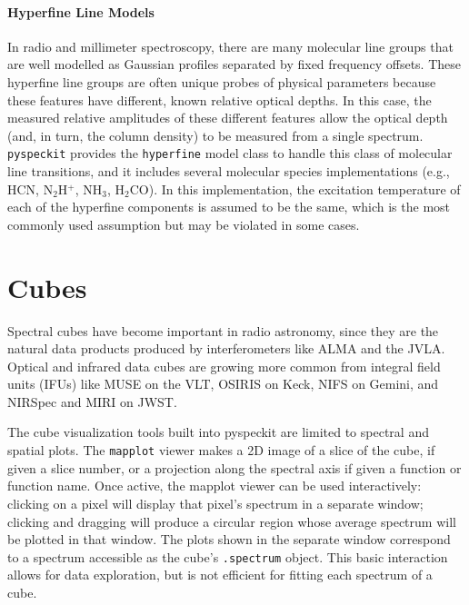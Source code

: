 \documentclass[twocolumn,linenumbers]{aastex63}
\newcommand{\pyspeckit}{\texttt{pyspeckit}\xspace}
\begin{document}
\paragraph{Hyperfine Line Models}
In radio and millimeter spectroscopy, there are many molecular line groups
that are well modelled as Gaussian profiles separated by fixed frequency
offsets.  These hyperfine line groups are often unique probes of physical
parameters because these features have different, known relative optical
depths.  In this case, the measured relative amplitudes of these different
features allow the optical depth (and, in turn, the column density) to be
measured from a single spectrum.  \pyspeckit provides the \texttt{hyperfine}
model class to handle this class of molecular line transitions, and it includes
several molecular species implementations (e.g., HCN, N$_2$H$^+$, NH$_3$, H$_2$CO). 
In this implementation, the excitation temperature of each of the hyperfine components is assumed to be the same, which is the most commonly used assumption but may be violated in some cases.



\section{Cubes}
\label{sec:cubes}
Spectral cubes have become important in radio astronomy, since they are the
natural data products produced by interferometers like ALMA and the JVLA.
Optical and infrared data cubes are growing
more common from integral field units (IFUs) like MUSE on
the VLT, OSIRIS on Keck, NIFS on Gemini, and NIRSpec and MIRI on JWST.

The cube visualization tools built into pyspeckit are limited to spectral and spatial plots.
The \texttt{mapplot} viewer makes a 2D image of a slice of the cube, if given a slice number,
or a projection along the spectral axis if given a function or function name.
Once active, the mapplot viewer can be used interactively: clicking on a pixel
will display that pixel's spectrum in a separate window; clicking and dragging
will produce a circular region whose average spectrum will be plotted in that
window.  The plots shown in the separate window correspond to a spectrum accessible
as the cube's \texttt{.spectrum} object. This basic interaction allows for data exploration,
but is not efficient for fitting each spectrum of a cube.
\end{document}
